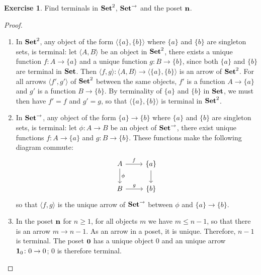\documentclass[11pt,a4paper,twoside]{article}
\newcommand{\aname}[1]{{\normalfont\textbf{#1}}}
\newcommand{\Id}{\aname{1}}
\newcommand{\catname}[1]{{\normalfont\textbf{#1}}}
\newcommand{\Set}{\catname{Set}}
\theoremstyle{definition}
\newcounter{excounter}
\newtheorem{exercise}[excounter]{Exercise}
\begin{document}
\begin{exercise}

Find terminals in $\Set^2$, $\Set^\to$ and the poset $\catname{n}$.

\end{exercise}

\begin{proof}\hfill

  \begin{enumerate}
  \item In $\Set^2$, any object of the form $\langle \{ a \}, \{ b \} \rangle$ where $\{ a \}$ and $\{ b \}$ are singleton sets, is terminal: let $\langle A, B \rangle$ be an object in $\Set^2$, there exists a unique function $f \colon A \to \{ a \}$ and a unique function $g \colon B \to \{ b \}$, since both $\{ a \}$ and $\{ b \}$ are terminal in $\Set$. Then $\langle f, g \rangle \colon \langle A, B \rangle \to \langle \{ a \}, \{ b \} \rangle$ is an arrow of $\Set^2$. For all arrows $\langle f', g' \rangle$ of $\Set^2$ between the same objects, $f'$ is a function $A \to \{ a \}$ and $g'$ is a function $B \to \{ b \}$. By terminality of $\{ a \}$ and $\{ b \}$ in $\Set$, we must then have $f' = f$ and $g' = g$, so that $\langle \{ a \}, \{ b \} \rangle$ is terminal in $\Set^2$.

  \item In $\Set^\to$, any object of the form $\{ a \} \to \{ b \}$ where $\{ a \}$ and $\{ b \}$ are singleton sets, is terminal: let $\phi \colon A \to B$ be an object of $\Set^\to$, there exist unique functions $f \colon A \to \{ a \}$ and $g \colon B \to \{  b \}$. These functions make the following diagram commute:
    \begin{equation}
      \begin{tikzcd}
        A \arrow[d, "\phi"] \arrow[r, "f"] & \{ a \} \arrow[d] \\
        B \arrow[r, "g"]                   & \{ b \}                  
      \end{tikzcd}      
    \end{equation}
    so that $\langle f, g \rangle$ is the unique arrow of $\Set^\to$ between $\phi$ and $\{ a \} \to \{ b \}$.

  \item In the poset $\catname{n}$ for $n \geq 1$, for all objects $m$ we have $m \leq n - 1$, so that there is an arrow $m \to n - 1$. As an arrow in a poset, it is unique. Therefore, $n - 1$ is terminal. The poset $\catname{0}$ has a unique object $0$ and an unique arrow $\Id_0 \colon 0 \to 0$; $0$ is therefore terminal.
  \end{enumerate}

\end{proof}
\end{document}
